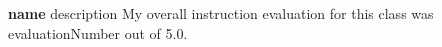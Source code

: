 \textbf{{name}} {{description}} My overall instruction evaluation 
for this class was {{evaluationNumber}} out of 5.0.
